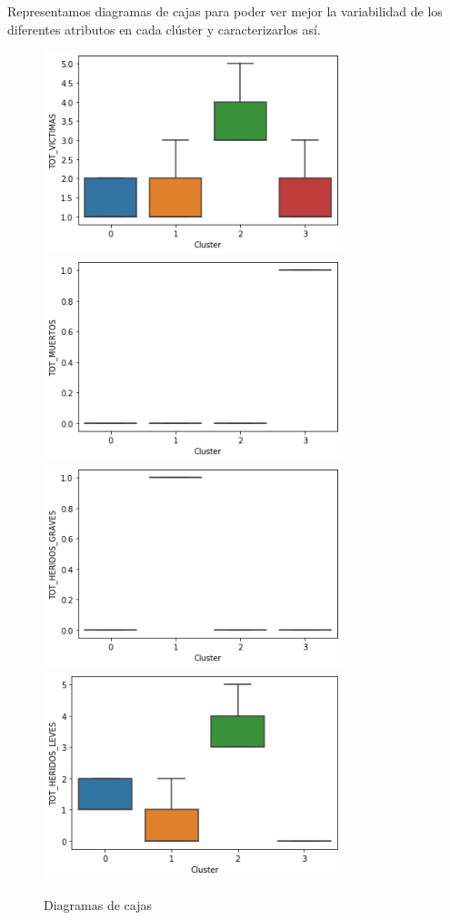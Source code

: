 \documentclass[a4]{article}
\begin{document}
Representamos diagramas de cajas para poder ver mejor la variabilidad de los diferentes atributos en cada clúster y caracterizarlos así.

\begin{figure}[H]
  \centering
  \caption{Diagramas de cajas}
  \includegraphics[width=87mm]{imagenes/c3_kmeans_vic}
  \includegraphics[width=87mm]{imagenes/c3_kmeans_muertos}
  \includegraphics[width=87mm]{imagenes/c3_kmeans_hg}
  \includegraphics[width=87mm]{imagenes/c3_kmeans_hl}

\end{figure}
\end{document}
